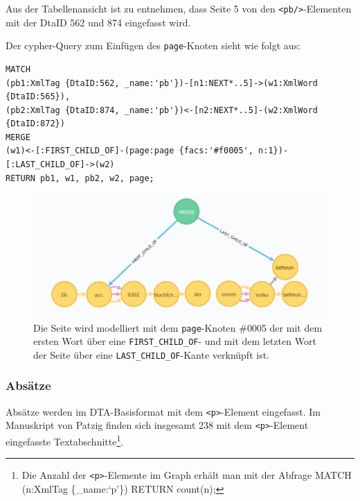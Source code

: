 \documentclass[12pt,ngerman,]{article}
\begin{document}
Aus der Tabellenansicht ist zu entnehmen, dass Seite 5 von den
\texttt{\textless{}pb/\textgreater{}}-Elementen mit der DtaID 562 und
874 eingefasst wird.

Der cypher-Query zum Einfügen des \texttt{page}-Knoten sieht wie folgt
aus:

\begin{verbatim}
MATCH
(pb1:XmlTag {DtaID:562, _name:'pb'})-[n1:NEXT*..5]->(w1:XmlWord {DtaID:565}),
(pb2:XmlTag {DtaID:874, _name:'pb'})<-[n2:NEXT*..5]-(w2:XmlWord {DtaID:872})
MERGE
(w1)<-[:FIRST_CHILD_OF]-(page:page {facs:'#f0005', n:1})-[:LAST_CHILD_OF]->(w2)
RETURN pb1, w1, pb2, w2, page;
\end{verbatim}

\begin{figure}
\centering
\includegraphics{Bilder/TEI2Graph/page-f0005.png}
\caption[Die Seite wird modelliert mit dem \texttt{page}-Knoten \#0005
der mit dem ersten Wort über eine \texttt{FIRST\_CHILD\_OF}- und mit dem
letzten Wort der Seite über eine \texttt{LAST\_CHILD\_OF}-Kante
verknüpft ist.]{Die Seite wird modelliert mit dem \texttt{page}-Knoten
\#0005 der mit dem ersten Wort über eine \texttt{FIRST\_CHILD\_OF}- und
mit dem letzten Wort der Seite über eine \texttt{LAST\_CHILD\_OF}-Kante
verknüpft ist.\footnotemark{}}
\end{figure}

\subsubsection{Absätze}\label{absuxe4tze}

Absätze werden im DTA-Basisformat mit dem
\texttt{\textless{}p\textgreater{}}-Element eingefasst. Im Manuskript
von Patzig finden sich insgesamt 238 mit dem
\texttt{\textless{}p\textgreater{}}-Element eingefasste
Textabschnitte\footnote{Die Anzahl der
  \texttt{\textless{}p\textgreater{}}-Elemente im Graph erhält man mit
  der Abfrage MATCH (n:XmlTag \{\_name:`p'\}) RETURN count(n);}.
\end{document}

